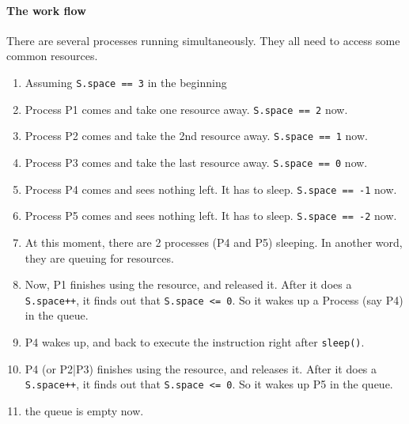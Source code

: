 \paragraph{The work flow}

There are several processes running simultaneously. They all need to
access some common resources.
\begin{enumerate}
\item Assuming \texttt{S.space == 3} in the beginning
\item Process P1 comes and take one resource away. \texttt{S.space == 2} now.
\item Process P2 comes and take the 2nd resource away. \texttt{S.space == 1} now.
\item Process P3 comes and take the last resource away. \texttt{S.space == 0} now.
\item Process P4 comes and sees nothing left. It has to sleep. \texttt{S.space == -1} now.
\item Process P5 comes and sees nothing left. It has to sleep. \texttt{S.space == -2} now.
\item At this moment, there are 2 processes (P4 and P5) sleeping. In another word, they
  are queuing for resources.
\item Now, P1 finishes using the resource, and released it. After it does a
  \texttt{S.space++}, it finds out that \texttt{S.space <= 0}. So it wakes up a Process
  (say P4) in the queue.
\item P4 wakes up, and back to execute the instruction right after \texttt{sleep()}.
\item P4 (or P2|P3) finishes using the resource, and releases it. After it does a
  \texttt{S.space++}, it finds out that \texttt{S.space <= 0}. So it wakes up P5 in the
  queue.
\item the queue is empty now.
\end{enumerate}

